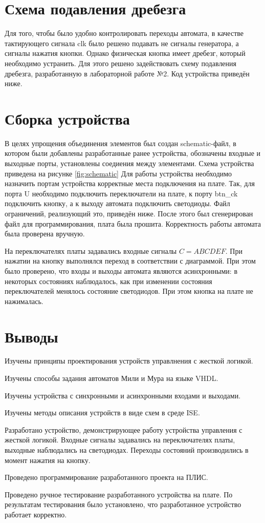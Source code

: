 \documentclass[a4paper, 14pt]{article}
\begin{document}
    \section{Схема подавления дребезга}
    Для того, чтобы было удобно контролировать переходы автомата, в качестве тактирующего сигнала clk было решено подавать не сигналы генератора, а сигналы нажатия кнопки.
    Однако физическая кнопка имеет дребезг, который необходимо устранить. Для этого решено задействовать схему подавления дребезга, разработанную в лабораторной работе №2.
    Код устройства приведён ниже.

    \section{Сборка устройства}
    В целях упрощения объединения элементов был создан schematic-файл, в котором были добавлены разработанные ранее устройства, обозначены входные и выходные порты, установлены соедиения между элементами.
    Схема устройства приведена на рисунке \ref{fig:schematic}
    Для работы устройства необходимо назначить портам устройства корректные места подключения на плате. Так, для порта U необходимо подключить переключатели на плате, 
    к порту btn\_ck подключить кнопку, а к выходу автомата подключить светодиоды. Файл ограничений, реализующий это, приведён ниже.
    После этого был сгенерирован файл для программирования, плата была прошита. Корректность работы автомата была проверена вручную.
    
    На переключателях платы задавались входные сигналы $ C ={ABCDEF}$. При нажатии на кнопку выполнялся переход в соответствии с диаграммой.
    При этом было проверено, что входы и выходы автомата являются асинхронными: в некоторых состояниях наблюдалось, как при изменении состояния переключателей менялось состояние светодиодов. При этом кнопка на плате не нажималась.

    \section*{Выводы}
    Изучены принципы проектирования устройств управлнения с жесткой логикой.

    Изучены способы задания автоматов Мили и Мура на языке VHDL.

    Изучены устройства с синхронными и асинхронными входами и выходами.

    Изучены методы описания устройств в виде схем в среде ISE.

    Разработано устройство, демонстрирующее работу устройства управления с жесткой логикой. Входные сигналы задавались на переключателях платы, выходные наблюдались на светодиодах. Переходы состояний производились в момент нажатия на кнопку.

    Проведено программирование разработанного проекта на ПЛИС.
    
    Проведено ручное тестирование разработанного устройства на плате. По результатам тестирования было установлено, что разработанное устройство работает корректно.
\end{document}
